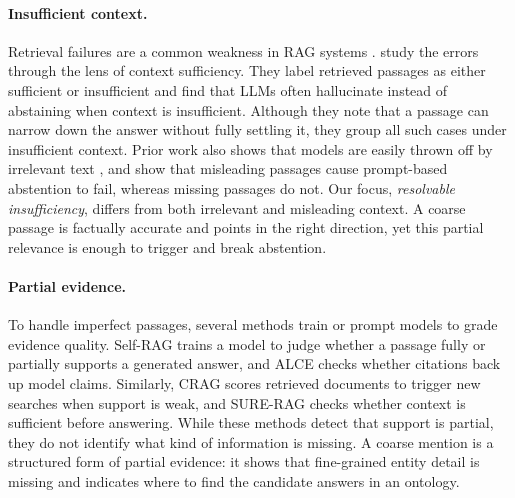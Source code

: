 

\paragraph{Insufficient context.}
Retrieval failures are a common weakness in RAG systems \citep{barnett2024seven}. \citet{joren2025sufficient} study the errors through the lens of context sufficiency. They label retrieved passages as either sufficient or insufficient and find that LLMs often hallucinate instead of abstaining when context is insufficient. Although they note that a passage can narrow down the answer without fully settling it, they group all such cases under insufficient context. Prior work also shows that models are easily thrown off by irrelevant text \citep{shi2023distracted,yoran2024robust}, and \citet{setiawan2026misleading} show that misleading passages cause prompt-based abstention to fail, whereas missing passages do not. Our focus, \emph{resolvable insufficiency}, differs from both irrelevant and misleading context. A coarse passage is factually accurate and points in the right direction, yet this partial relevance is enough to trigger \clade{} and break abstention.

\paragraph{Partial evidence.}
To handle imperfect passages, several methods train or prompt models to grade evidence quality. Self-RAG \citep{asai2024selfrag} trains a model to judge whether a passage fully or partially supports a generated answer, and ALCE \citep{gao2023alce} checks whether citations back up model claims. Similarly, CRAG \citep{yan2024crag} scores retrieved documents to trigger new searches when support is weak, and SURE-RAG \citep{qiu2026sure} checks whether context is sufficient before answering. While these methods detect that support is partial, they do not identify what kind of information is missing. A coarse mention is a structured form of partial evidence: it shows that fine-grained entity detail is missing and indicates where to find the candidate answers in an ontology.

